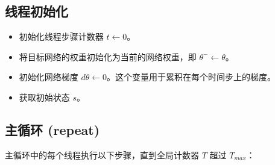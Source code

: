 \documentclass[twocolumn, 10pt]{article} %
\theoremstyle{remark}
\begin{document}
\subsection{线程初始化}
\begin{itemize}
    \item 初始化线程步骤计数器 \( t \leftarrow 0 \)。
    \item 将目标网络的权重初始化为当前的网络权重，即 \( \theta^- \leftarrow \theta \)。
    \item 初始化网络梯度 \( d\theta \leftarrow 0 \)。这个变量用于累积在每个时间步上的梯度。
    \item 获取初始状态 \( s \)。
\end{itemize}

\subsection{主循环 (repeat)}
主循环中的每个线程执行以下步骤，直到全局计数器 \( T \) 超过 \( T_{max} \)：
\end{document}
